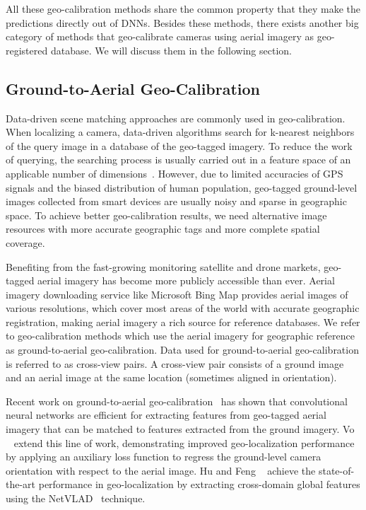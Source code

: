 All these geo-calibration methods share the common property that they
make the predictions directly out of DNNs. Besides these methods,
there exists another big category of methods that geo-calibrate
cameras using aerial imagery as geo-registered database. We will
discuss them in the following section.

\subsection{Ground-to-Aerial Geo-Calibration}
Data-driven scene matching approaches are commonly used in
geo-calibration.
When localizing a camera, data-driven algorithms search for k-nearest
neighbors of the query image in a database of the geo-tagged imagery.
To reduce the work of querying, the searching process is usually
carried out in a feature space of an applicable number of  
dimensions~\cite{im2gps, li2010location,zamir2010accurate}.
However, due to limited accuracies of GPS signals and the biased
distribution of human population, geo-tagged ground-level images
collected from smart devices are usually noisy and sparse in
geographic space. To achieve better geo-calibration results, we
need alternative image resources with more accurate geographic tags
and more complete spatial coverage.

Benefiting from the fast-growing monitoring satellite and drone markets,
geo-tagged aerial imagery has become more publicly accessible
than ever. Aerial imagery downloading service like
Microsoft Bing Map provides aerial images of various
resolutions, which cover most areas of the world with accurate
geographic registration, making aerial imagery a rich source for
reference databases. We refer to geo-calibration
methods which use the aerial imagery for geographic reference as
ground-to-aerial geo-calibration. Data used for ground-to-aerial
geo-calibration is referred to as cross-view pairs.
A cross-view pair consists of a ground image and an aerial image at
the same location (sometimes aligned in orientation).

Recent work on ground-to-aerial
geo-calibration~\cite{lin2013cross,lin2015learning,workman2015geocnn,workman2015wide}
has shown that convolutional neural networks are efficient for extracting
features from geo-tagged aerial imagery that can be matched to
features extracted from the ground imagery.  Vo
\etal~\cite{vo2016localizing} extend this line of work, demonstrating
improved geo-localization performance by applying an auxiliary loss
function to regress the ground-level camera orientation with respect
to the aerial image. Hu and Feng \etal~\cite{mh2018cvm} achieve the
state-of-the-art performance in geo-localization by extracting
cross-domain global features using the
NetVLAD~\cite{arandjelovic2016netvlad} technique.

